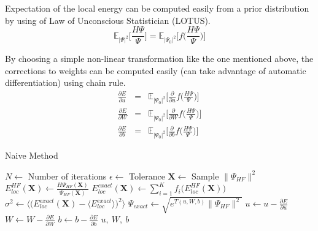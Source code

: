 \documentclass[12pt,a4paper]{article}
\begin{document}
Expectation of the local energy can be computed easily from a prior distribution by
using of Law of Unconscious Statistician (LOTUS).
\begin{equation}
\mathbb{E}_{|\Psi|^2}\bigg[ \frac{H\Psi}{\Psi} \bigg] = \mathbb{E}_{|\Psi_0|^2}\bigg[ f\bigg( \frac{H\Psi}{\Psi}\bigg) \bigg]
\end{equation}

By choosing a simple non-linear transformation like the one mentioned above, the
corrections to weights can be computed easily (can take advantage of automatic differentiation)
using chain rule.
\begin{eqnarray}
\frac{\partial E}{\partial u} &=& \mathbb{E}_{|\Psi_0|^2}\bigg[\frac{\partial }{\partial u} f\bigg(\frac{H\Psi}{\Psi}\bigg) \bigg]\\
\frac{\partial E}{\partial W} &=& \mathbb{E}_{|\Psi_0|^2}\bigg[\frac{\partial }{\partial W} f\bigg(\frac{H\Psi}{\Psi}\bigg) \bigg]\\
\frac{\partial E}{\partial b} &=& \mathbb{E}_{|\Psi_0|^2}\bigg[\frac{\partial }{\partial b} f\bigg(\frac{H\Psi}{\Psi}\bigg) \bigg]
\end{eqnarray}

\begin{algorithm}
  \caption{Naive Method}
  \begin{algorithmic}
      \State $N \gets$ Number of iterations
      \State $\epsilon \gets$ Tolerance
        \State $\mathbf{X} \gets$ Sample $\|\Psi_{HF}\|^2$
        \State $E_{loc}^{HF}(\mathbf{X}) \gets \frac{H\Psi_{HF}(\mathbf{X})}{\Psi_{HF}(\mathbf{X})}$
        \State $E_{loc}^{exact}(\mathbf{X}) \gets \sum_{i=1}^{K} f_i\bigg(E_{loc}^{HF}(\mathbf{X})\bigg)$
        \State $\sigma^2 \gets \bigg\langle \bigg(E_{loc}^{exact}(\mathbf{X}) - \langle E_{loc}^{exact} \rangle \bigg)^2 \bigg\rangle$
        \State {}
      \EndWhile
      \State $\Psi_{exact} \gets \sqrt{e^{T(u,W,b)}\|\Psi_{HF}\|^2}$
    \EndProcedure
    \Statex
      \State $u\gets u -\frac{\partial E}{\partial u}$
      \State $W\gets W -\frac{\partial E}{\partial W}$
      \State $b\gets b -\frac{\partial E}{\partial b}$
      \State \Return $u,\ W,\ b$
    \EndFunction
  \end{algorithmic}
\end{algorithm}
\end{document}
